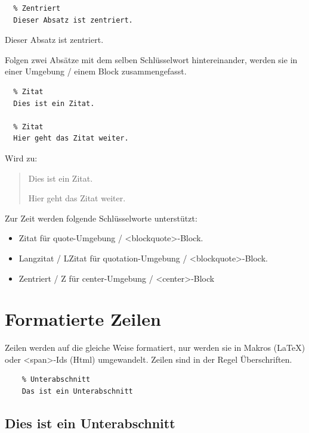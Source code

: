 \documentclass{scrartcl}
\begin{document}
\begin{verbatim}
  % Zentriert
  Dieser Absatz ist zentriert.
\end{verbatim}


\begin{center}
Dieser Absatz ist zentriert.
\end{center}


{Folgen zwei Absätze mit dem selben Schlüsselwort
hintereinander, werden sie in einer Umgebung / einem Block
zusammengefasst.\\}

\begin{verbatim}
  % Zitat
  Dies ist ein Zitat.

  % Zitat
  Hier geht das Zitat weiter.
\end{verbatim}


{Wird zu:\\}

\colorbox{gray!75}{\parbox{\linewidth}{%
\begin{quote}
\centering%
Dies ist ein Zitat.

Hier geht das Zitat weiter.
\end{quote}

}
}

{Zur Zeit werden folgende Schlüsselworte unterstützt:\\}

\begin{itemize}
\item Zitat für quote-Umgebung / <blockquote>-Block.
\item Langzitat / LZitat für quotation-Umgebung / <blockquote>-Block.
\item Zentriert / Z für center-Umgebung / <center>-Block
\end{itemize}


\section{Formatierte Zeilen}

{Zeilen werden auf die gleiche Weise formatiert, nur werden sie in Makros (LaTeX) oder <span>-Ids (Html) umgewandelt. Zeilen sind in der Regel Überschriften.\\}

\begin{verbatim}
    % Unterabschnitt
    Das ist ein Unterabschnitt
\end{verbatim}


\subsection{Dies ist ein Unterabschnitt}
\end{document}
